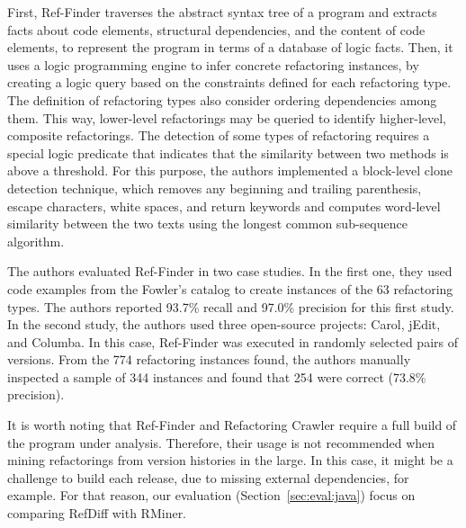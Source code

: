 First, Ref-Finder traverses the abstract syntax tree of a program and extracts facts about code elements, structural dependencies, and the content of code elements, to represent the program in terms of a database of logic facts. Then, it uses a logic programming engine to infer concrete refactoring instances, by creating a logic query based on the constraints defined for each refactoring type.
The definition of refactoring types also consider ordering dependencies among them. This way, lower-level refactorings may be queried to identify higher-level, composite refactorings.
The detection of some types of refactoring requires a special logic predicate that indicates that the similarity between two methods is above a threshold. For this purpose, the authors implemented a block-level clone detection technique, which removes any beginning and trailing parenthesis, escape characters, white spaces, and return keywords and computes word-level similarity between the two texts using the longest common sub-sequence algorithm.

The authors evaluated Ref-Finder in two case studies.
In the first one, they used code examples from the Fowler's catalog to create instances of the 63 refactoring types. The authors reported 93.7\% recall and 97.0\% precision for this first study.
In the second study, the authors used three open-source projects: Carol, jEdit, and Columba. In this case, Ref-Finder was executed in randomly selected pairs of versions. From the 774 refactoring instances found, the authors manually inspected a sample of 344 instances and found that 254 were correct (73.8\% precision).

It is worth noting that Ref-Finder and Refactoring Crawler require a full build of the program under analysis.
Therefore, their usage is not recommended when mining refactorings from version histories in the large.
In this case, it might be a challenge to build each release, due to missing external dependencies, for example.
For that reason, our evaluation (Section~\ref{sec:eval:java}) focus on comparing RefDiff with RMiner.

